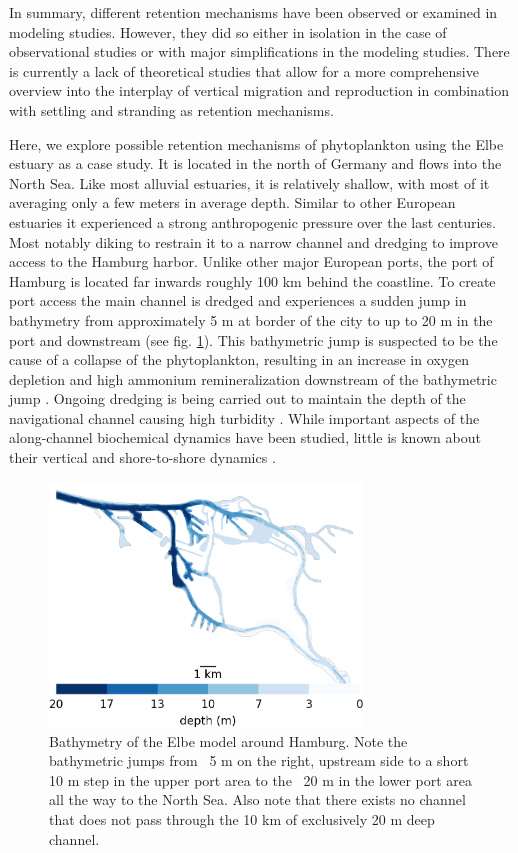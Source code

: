 \documentclass[npg, manuscript]{copernicus}
\begin{document}
In summary, different retention mechanisms have been observed or examined in modeling studies.
However, they did so either in isolation in the case of observational studies or with major simplifications in the modeling studies.
There is currently a lack of theoretical studies that allow for a more comprehensive overview into the interplay of vertical migration and reproduction in combination with settling and stranding as retention mechanisms.


Here, we explore possible retention mechanisms of phytoplankton using the Elbe estuary as a case study.
It is located in the north of Germany and flows into the North Sea.
Like most alluvial estuaries, it is relatively shallow, with most of it averaging only a few meters in average depth.
Similar to other European estuaries it experienced a strong anthropogenic pressure over the last centuries.
Most notably diking to restrain it to a narrow channel and dredging to improve access to the Hamburg harbor.
Unlike other major European ports, the port of Hamburg is located far inwards roughly 100 \unit{km} behind the coastline.
To create port access the main channel is dredged and experiences a sudden jump in bathymetry from approximately 5 \unit{m} at border of the city to up to 20 \unit{m} in the port and downstream (see fig. \ref{fig:bathymetry}). 
This bathymetric jump is suspected to be the cause of a collapse of the phytoplankton, resulting in an increase in oxygen depletion and high ammonium remineralization downstream of the bathymetric jump \citep{Schroeder1997,Holzwarth2018,Sanders2018}.
Ongoing dredging is being carried out to maintain the depth of the navigational channel causing high turbidity \citep{Kappenberg2001}.
While important aspects of the along-channel biochemical dynamics have been studied, little is known about their vertical and shore-to-shore dynamics \citep{Goosen1999, Dahnke2008, Sanders2018}.

\begin{figure}
    \includegraphics[width=8.3cm]{harbor_small.png}
    \caption{Bathymetry of the Elbe model around Hamburg. Note the bathymetric jumps from ~5 \unit{m} on the right, upstream side to a short 10 \unit{m} step in the upper port area to the ~20 \unit{m} in the lower port area all the way to the North Sea. Also note that there exists no channel that does not pass through the 10 \unit{km} of exclusively 20 \unit{m} deep channel.}
    \label{fig:bathymetry}
\end{figure}
\end{document}
